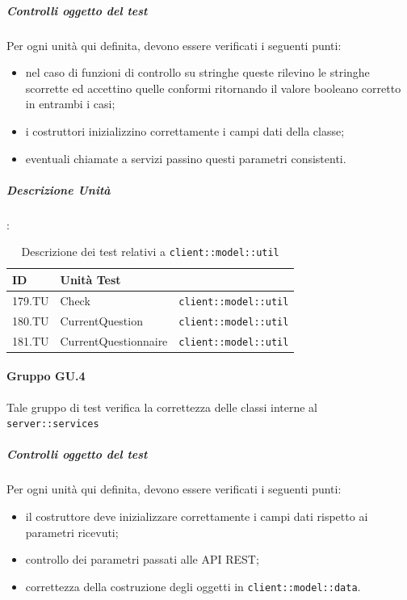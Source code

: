 \documentclass[12pt,a4paper]{article}
\begin{document}
	\subparagraph{Controlli oggetto del test}
	Per ogni unità  qui definita, devono essere verificati i seguenti punti:
	
	\begin{itemize}
		\item nel caso di funzioni di controllo su stringhe queste rilevino le stringhe scorrette ed accettino quelle conformi ritornando il valore booleano corretto in entrambi i casi;
		\item i costruttori inizializzino correttamente i campi dati della classe;
		\item eventuali chiamate a servizi passino  questi parametri consistenti.
	\end{itemize}
	
	\subparagraph{Descrizione Unità}:
	
	\begin{table}[H]
		\begin{center}
			\begin{tabular}{p{} p{0.4\textwidth} p{}}
				\toprule
				\textbf{ID}   & \textbf{Unità Test}	& \textbf{\mgls{package}} \\ \midrule
				\midrule
				179.TU & Check & \texttt{client::model::util}\\ \midrule
				180.TU & CurrentQuestion & \texttt{client::model::util}\\ \midrule
				181.TU & CurrentQuestionnaire & \texttt{client::model::util}\\ \midrule
				
				\bottomrule
			\end{tabular}
		\end{center}
		\caption{Descrizione dei test relativi a \texttt{client::model::util}}
	\end{table}
	
	\paragraph{Gruppo GU.4}
	Tale gruppo di test verifica la correttezza delle classi interne al  \texttt{server::services}
	
	\subparagraph{Controlli oggetto del test}
	Per ogni unità  qui definita, devono essere verificati i seguenti punti:
	
	\begin{itemize}
		\item il costruttore deve inizializzare correttamente i campi dati rispetto ai parametri ricevuti;
		\item controllo dei parametri passati alle API REST;
		\item correttezza della costruzione degli oggetti in \texttt{client::model::data}.
	\end{itemize}
	
\end{document}
